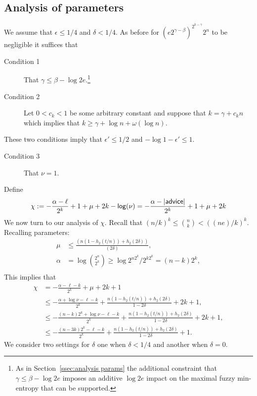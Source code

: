 \subsection{Analysis of parameters}
We assume that $\epsilon\le 1/4$ and $\delta<1/4$.  As before for  
$
\left(e2^{\gamma-\beta}\right)^{2^{k-\gamma}}2^n$ to be negligible it suffices that
\begin{description}
\item[Condition 1] That $\gamma \le \beta-\log{2e}.$\footnote{As in Section~\ref{ssec:analysis params} the additional constraint that 
$
\gamma \le \beta - \log{2e}$ 
imposes an additive $\log{2e}$ impact on the maximal fuzzy min-entropy that can be supported. 
}
\item[Condition 2] Let $0<c_k<1$ be some arbitrary constant and suppose that $k= \gamma+c_kn$ which implies that $k\ge \gamma + \log{n+\omega(\log{n})}$.
\end{description}
These two conditions imply that $\epsilon'\le 1/2$ and $-\log{1-\epsilon'}\le 1$.
\begin{description}
\item[Condition 3] That  $\nu = 1$.
\end{description}
Define \[\chi: =-\frac{\alpha-\ell}{2^k}+1+\mu+2k-\mathsf{log}\!\left(\nu\right)=-\frac{\alpha-|{\mathsf{advice}}|}{2^k}+1+\mu+2k\]
We now turn to our analysis of $\chi$.  Recall that $(n/k)^k \le {n\choose k} < ((ne)/k)^k$.  Recalling parameters: 
\begin{align*}
\mu&\le \frac{(n(1-h_2(t/n)) +h_2(2\delta))}{(2\delta)},\\
\alpha &= \log{2^n\choose 2^k} \ge \log{2^{n2^k} /2^{k2^k}} = (n-k)2^k,\\
\end{align*}
This implies that 
\begin{align*}
\chi&= -\frac{\alpha-\ell-k}{2^k} + \mu +2k+1\\
&\le  -\frac{\alpha +\log{\nu}-\ell-k}{2^k} +\frac{n(1-h_2(t/n)) +h_2(2\delta)}{1-2\delta}  + 2k+1,\\
&\le - \frac{(n-k)2^k +\log{\nu}-\ell-k}{2^k} +\frac{n(1-h_2(t/n)) +h_2(2\delta)}{1-2\delta} + 2k+1,\\
&\le  -\frac{(n-3k)2^k-\ell-k}{2^k} + \frac{n(1-h_2(t/n)) +h_2(2\delta)}{1-2\delta}+1.
\end{align*}
We consider two settings for $\delta$ one when $\delta<1/4$ and another when $\delta=0$.

